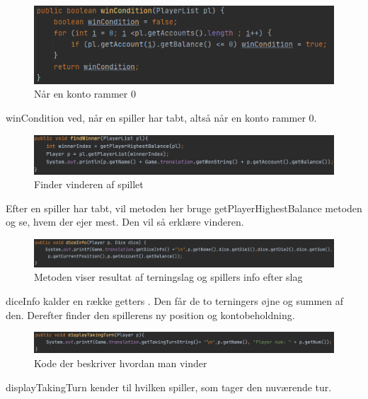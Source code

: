 \begin{figure}[H]
    \centering
    \includegraphics{sources/7_implementering/logic_wincondition.PNG}
    \caption{Når en konto rammer 0}
    \label{fig:logicWinCon}
\end{figure}
winCondition ved, når en spiller har tabt, altså når en konto rammer 0.

\begin{figure}[H]
    \centering
    \includegraphics{sources/7_implementering/LogicfindWinner.png}
    \caption{Finder vinderen af spillet}
    \label{fig:logicFindWinner}
\end{figure}
Efter en spiller har tabt, vil metoden her bruge getPlayerHighestBalance metoden og se, hvem der ejer mest. Den vil så erklære vinderen.

\begin{figure}[H]
    \centering
    \includegraphics{sources/7_implementering/LogicdiceInfo.png}
    \caption{Metoden viser resultat af terningslag og spillers info efter slag}
    \label{fig:logicDiceInfo}
\end{figure}
diceInfo kalder en række getters . Den får de to terningers øjne og summen af den. Derefter finder den spillerens ny position og kontobeholdning. 

\begin{figure}[H]
    \centering
    \includegraphics{sources/7_implementering/LogicTakingTurn.png}
    \caption{Kode der beskriver hvordan man vinder}
    \label{fig:logicDisplayTakingTurn}
\end{figure}
displayTakingTurn kender til hvilken spiller, som tager den nuværende tur.

